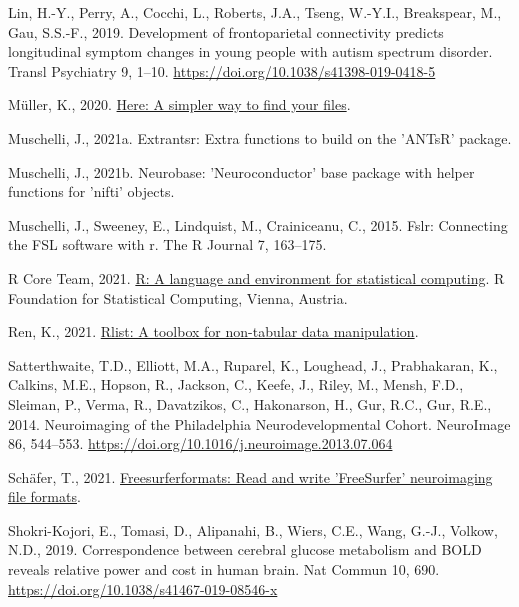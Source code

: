 \documentclass[
  12pt,
]{article}
\newlength{\cslhangindent}
\newlength{\cslentryspacingunit} %
\newenvironment{CSLReferences}[2] %
 {%
  \setlength{\parindent}{0pt}
  \ifodd #1
  \let\oldpar\par
  \def\par{\hangindent=\cslhangindent\oldpar}
  \fi
  \setlength{\parskip}{#2\cslentryspacingunit}
 }%
 {}
\begin{document}
\begin{CSLReferences}{1}{0}
\leavevmode{}%
Lin, H.-Y., Perry, A., Cocchi, L., Roberts, J.A., Tseng, W.-Y.I., Breakspear, M., Gau, S.S.-F., 2019. Development of frontoparietal connectivity predicts longitudinal symptom changes in young people with autism spectrum disorder. Transl Psychiatry 9, 1--10. \url{https://doi.org/10.1038/s41398-019-0418-5}

\leavevmode{}%
Müller, K., 2020. \href{https://CRAN.R-project.org/package=here}{Here: A simpler way to find your files}.

\leavevmode{}%
Muschelli, J., 2021a. Extrantsr: Extra functions to build on the 'ANTsR' package.

\leavevmode{}%
Muschelli, J., 2021b. Neurobase: 'Neuroconductor' base package with helper functions for 'nifti' objects.

\leavevmode{}%
Muschelli, J., Sweeney, E., Lindquist, M., Crainiceanu, C., 2015. Fslr: Connecting the FSL software with r. The R Journal 7, 163--175.

\leavevmode{}%
R Core Team, 2021. \href{https://www.R-project.org/}{R: A language and environment for statistical computing}. R Foundation for Statistical Computing, Vienna, Austria.

\leavevmode{}%
Ren, K., 2021. \href{https://CRAN.R-project.org/package=rlist}{Rlist: A toolbox for non-tabular data manipulation}.

\leavevmode{}%
Satterthwaite, T.D., Elliott, M.A., Ruparel, K., Loughead, J., Prabhakaran, K., Calkins, M.E., Hopson, R., Jackson, C., Keefe, J., Riley, M., Mensh, F.D., Sleiman, P., Verma, R., Davatzikos, C., Hakonarson, H., Gur, R.C., Gur, R.E., 2014. Neuroimaging of the {Philadelphia} {Neurodevelopmental} {Cohort}. NeuroImage 86, 544--553. \url{https://doi.org/10.1016/j.neuroimage.2013.07.064}

\leavevmode{}%
Schäfer, T., 2021. \href{https://CRAN.R-project.org/package=freesurferformats}{Freesurferformats: Read and write 'FreeSurfer' neuroimaging file formats}.

\leavevmode{}%
Shokri-Kojori, E., Tomasi, D., Alipanahi, B., Wiers, C.E., Wang, G.-J., Volkow, N.D., 2019. Correspondence between cerebral glucose metabolism and {BOLD} reveals relative power and cost in human brain. Nat Commun 10, 690. \url{https://doi.org/10.1038/s41467-019-08546-x}


\end{CSLReferences}
\end{document}
